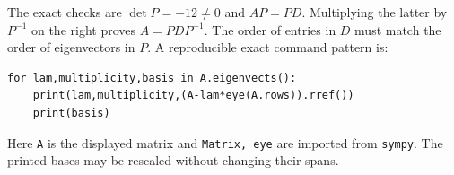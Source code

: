 The exact checks are $\det P=-12\ne0$ and $AP=PD$. Multiplying the latter by $P^{-1}$ on the right proves $A=PDP^{-1}$. The order of entries in $D$ must match the order of eigenvectors in $P$.
A reproducible exact command pattern is:
\begin{verbatim}
for lam,multiplicity,basis in A.eigenvects():
    print(lam,multiplicity,(A-lam*eye(A.rows)).rref())
    print(basis)
\end{verbatim}
Here \texttt{A} is the displayed matrix and \texttt{Matrix, eye} are imported from \texttt{sympy}. The printed bases may be rescaled without changing their spans.

